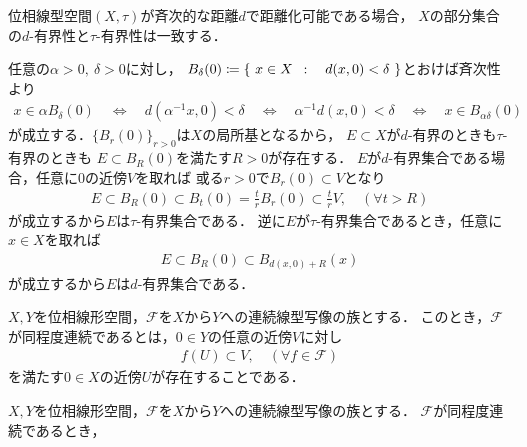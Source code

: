 	\begin{screen}
		\begin{thm}[斉次距離で距離化可能なら距離と位相の有界性は一致する]
			位相線型空間$(X,\tau)$が斉次的な距離$d$で距離化可能である場合，
			$X$の部分集合の$d$-有界性と$\tau$-有界性は一致する．
		\end{thm}
	\end{screen}
	
	\begin{prf}
		任意の$\alpha>0,\ \delta>0$に対し，
		$B_{\delta}(0) \coloneqq \left\{\ x \in X\ \, : \quad d(x,0) < \delta\ \right\}$とおけば斉次性より
		\begin{align}
			x \in \alpha B_{\delta}(0) 
			\quad \Longleftrightarrow \quad d\left( \alpha^{-1}x,0 \right) < \delta
			\quad \Longleftrightarrow \quad \alpha^{-1}d(x,0) < \delta
			\quad \Longleftrightarrow \quad x \in B_{\alpha\delta}(0)
		\end{align}
		が成立する．$\{B_r(0)\}_{r > 0}$は$X$の局所基となるから，
		$E \subset X$が$d$-有界のときも$\tau$-有界のときも
		$E \subset B_R(0)$を満たす$R > 0$が存在する．
		$E$が$d$-有界集合である場合，任意に0の近傍$V$を取れば
		或る$r > 0$で$B_r(0) \subset V$となり
		\begin{align}
			E \subset B_R(0) \subset B_t(0) = \frac{t}{r} B_r(0) \subset \frac{t}{r}V,
			\quad (\forall t > R)
		\end{align}
		が成立するから$E$は$\tau$-有界集合である．
		逆に$E$が$\tau$-有界集合であるとき，任意に$x \in X$を取れば
		\begin{align}
			E \subset B_R(0) \subset B_{d(x,0) + R}(x)
		\end{align}
		が成立するから$E$は$d$-有界集合である．
		\QED
	\end{prf}
	
	\begin{screen}
		\begin{dfn}[位相線型空間における同程度連続性]
			$X,Y$を位相線形空間，$\mathscr{F}$を$X$から$Y$への連続線型写像の族とする．
			このとき，$\mathscr{F}$が同程度連続であるとは，$0 \in Y$の任意の近傍$V$に対し
			\begin{align}
				f(U) \subset V,\quad (\forall f \in \mathscr{F})
			\end{align}
			を満たす$0 \in X$の近傍$U$が存在することである．
		\end{dfn}
	\end{screen}
	
	\begin{screen}
		\begin{thm}[同程度連続な写像族の有界性]
			$X,Y$を位相線形空間，$\mathscr{F}$を$X$から$Y$への連続線型写像の族とする．
			$\mathscr{F}$が同程度連続であるとき，
		\end{thm}
	\end{screen}
	
